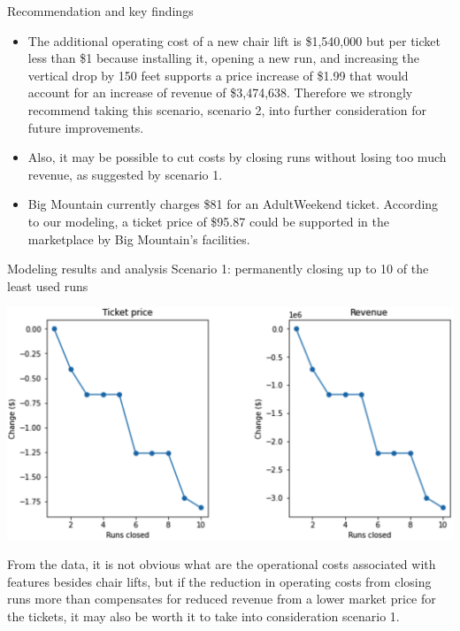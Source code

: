 \documentclass{beamer}
\begin{document}
\begin{frame}{Recommendation and key findings}
\begin{itemize}
\item
The additional operating cost of a new chair lift
is \$1,540,000 but per ticket less than \$1 because installing it,
opening a new run, and increasing the vertical drop by 150 feet supports a
price increase of \$1.99 that would account for an increase of revenue of
\$3,474,638. Therefore we strongly recommend taking this scenario,
scenario 2, into further consideration for future improvements.
\item
Also, it may be possible to cut costs by closing runs without losing too
much revenue, as suggested by scenario 1.
\item
Big Mountain currently charges \$81 for an AdultWeekend ticket. According
to our modeling, a ticket price of \$95.87 could be supported in the marketplace
by Big Mountain's facilities. 
\end{itemize}
\end{frame}

\begin{frame}{Modeling results and analysis}
Scenario 1: permanently closing up to 10 of the least used runs

\includegraphics[scale=0.2]{effectofclosingrunsonmarketpriceandrevenue}

From the data, it is not obvious what are the operational costs
associated with features besides chair lifts, but if the reduction in operating
costs from closing runs more than compensates for reduced revenue from a lower
market price for the tickets, it may also be worth it to take into consideration
scenario 1.
\end{frame}
\end{document}
